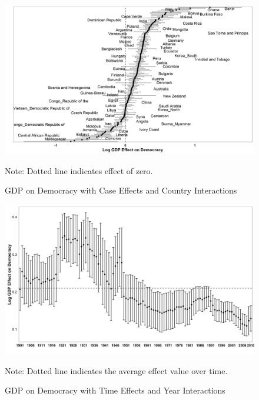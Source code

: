 \documentclass{article}[12pt]
\begin{document}
\begin{figure}[ht]
	\centering
	\includegraphics[width=\linewidth]{withinbetween}
	\caption{GDP on Democracy with Case Effects and Country Interactions}\label{withinwithin}
	{\scriptsize Note: Dotted line indicates effect of zero.}
\end{figure}
\begin{figure}[ht]
	\centering
	\includegraphics[width=\linewidth]{betweenbetween}
	\caption{GDP on Democracy with Time Effects and Year Interactions}\label{betweenbetween}
	{\scriptsize Note: Dotted line indicates the average effect value over time.}
\end{figure}
\end{document}
